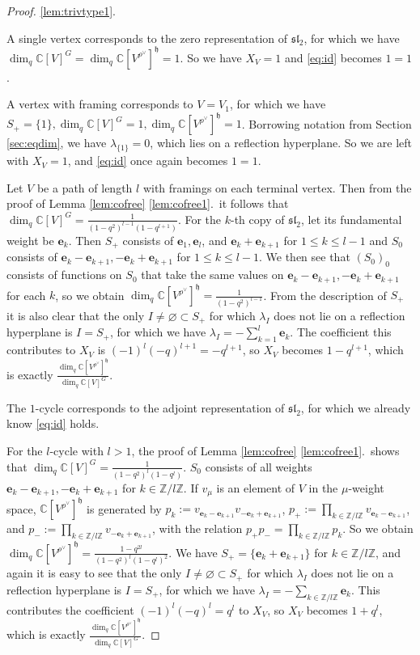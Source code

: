 \documentclass[12pt]{article}
\renewcommand{\b}[1]{\textbf{#1}}
\newcommand{\Z}{\mathbb{Z}}
\newcommand{\C}{\mathbb{C}}
\renewcommand{\sl}{\mathfrak{sl}}
\theoremstyle{definition}
\theoremstyle{remark}
\newcommand{\h}{\mathfrak{h}}
\begin{document}
\begin{proof}
\ref{lem:trivtype1}.

A single vertex corresponds to the zero representation of $\sl_2$, for which we have $\dim_q\C[V]^G=\dim_q\C[V^{\rho^\vee}]^\h=1$. So we have $X_V=1$ and \eqref{eq:id} becomes $1=1$.

A vertex with framing corresponds to $V=V_1$, for which we have $S_+=\{1\},\dim_q\C[V]^G=1,\dim_q\C[V^{\rho^\vee}]^\h=1$. Borrowing notation from Section \ref{sec:eqdim}, we have $\lambda_{\{1\}}=0$, which lies on a reflection hyperplane. So we are left with $X_V=1$, and \eqref{eq:id} once again becomes $1=1$.

Let $V$ be a path of length $l$ with framings on each terminal vertex. Then from the proof of Lemma \ref{lem:cofree} \ref{lem:cofree1}.~it follows that $\dim_q\C[V]^G=\frac{1}{(1-q^2)^{l-1}(1-q^{l+1})}$.
For the $k$-th copy of $\sl_2$, let its fundamental weight be $\b{e}_k$. Then $S_+$ consists of $\b{e}_1,\b{e}_l$, and $\b{e}_k+\b{e}_{k+1}$ for $1\leq k\leq l-1$ and $S_0$ consists of $\b{e}_k-\b{e}_{k+1},-\b{e}_k+\b{e}_{k+1}$ for $1\leq k\leq l-1$. We then see that $(S_0)_0$ consists of functions on $S_0$ that take the same values on $\b{e}_k-\b{e}_{k+1},-\b{e}_k+\b{e}_{k+1}$ for each $k$, so we obtain $\dim_q\C[V^{\rho^\vee}]^\h=\frac{1}{(1-q^2)^{l-1}}$. From the description of $S_+$ it is also clear that the only $I\neq\varnothing\subset S_+$ for which $\lambda_I$ does not lie on a reflection hyperplane is $I=S_+$, for which we have $\lambda_I=-\sum_{k=1}^l\b{e}_k$. The coefficient this contributes to $X_V$ is $(-1)^l(-q)^{l+1}=-q^{l+1}$, so $X_V$ becomes $1-q^{l+1}$, which is exactly $\frac{\dim_q\C[V^{\rho^\vee}]^\h}{\dim_q\C[V]^G}$.

The $1$-cycle corresponds to the adjoint representation of $\sl_2$, for which we already know \eqref{eq:id} holds.

For the $l$-cycle with $l>1$, the proof of Lemma \ref{lem:cofree} \ref{lem:cofree1}.~shows that $\dim_q\C[V]^G=\frac{1}{(1-q^2)^l(1-q^l)}$. $S_0$ consists of all weights $\b{e}_k-\b{e}_{k+1},-\b{e}_k+\b{e}_{k+1}$ for $k\in\Z/l\Z$. If $v_\mu$ is an element of $V$ in the $\mu$-weight space, $\C[V^{\rho^\vee}]^\h$ is generated by $p_k:=v_{\b{e}_k-\b{e}_{k+1}}v_{-\b{e}_k+\b{e}_{k+1}}$, $p_+:=\prod_{k\in\Z/l\Z}v_{\b{e}_k-\b{e}_{k+1}}$, and $p_-:=\prod_{k\in\Z/l\Z}v_{-\b{e}_k+\b{e}_{k+1}}$, with the relation $p_+p_-=\prod_{k\in\Z/l\Z}p_k$. So we obtain $\dim_q\C[V^{\rho^\vee}]^\h=\frac{1-q^{2l}}{(1-q^2)^l(1-q^l)^2}$. 
We have $S_+=\{\b{e}_k+\b{e}_{k+1}\}$ for $k\in\Z/l\Z$, and again it is easy to see that the only $I\neq\varnothing\subset S_+$ for which $\lambda_I$ does not lie on a reflection hyperplane is $I=S_+$, for which we have $\lambda_I=-\sum_{k\in\Z/l\Z}\b{e}_k$. This contributes the coefficient $(-1)^l(-q)^l=q^l$ to $X_V$, so $X_V$ becomes $1+q^l$, which is exactly $\frac{\dim_q\C[V^{\rho^\vee}]^\h}{\dim_q\C[V]^G}$.


\end{proof}
\end{document}
